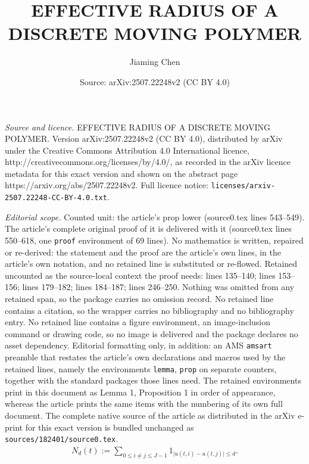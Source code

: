 \documentclass[10pt,a4paper]{amsart}
\title{EFFECTIVE RADIUS OF A DISCRETE MOVING POLYMER}
\author{Jiaming Chen}
\date{Source: arXiv:2507.22248v2 (CC BY 4.0)}
\begin{document}
\maketitle

\noindent\emph{Source and licence.} EFFECTIVE RADIUS OF A DISCRETE MOVING POLYMER. Version arXiv:2507.22248v2 (CC BY 4.0), distributed by arXiv under the Creative Commons Attribution 4.0 International licence, http://creativecommons.org/licenses/by/4.0/, as recorded in the arXiv licence metadata for this exact version and shown on the abstract page https://arxiv.org/abs/2507.22248v2. Full licence notice: \texttt{licenses/arxiv-2507.22248-CC-BY-4.0.txt}.\par\smallskip

\noindent\textit{Editorial scope.} Counted unit: the article's prop lower (source0.tex lines 543--549). The article's complete original proof of it is delivered with it (source0.tex lines 550--618, one \texttt{proof} environment of 69 lines). No mathematics is written, repaired or re-derived: the statement and the proof are the article's own lines, in the article's own notation, and no retained line is substituted or re-flowed.  Retained uncounted as the source-local context the proof needs: lines 135--140; lines 153--156; lines 179--182; lines 184--187; lines 246--250.  Nothing was omitted from any retained span, so the package carries no omission record.  No retained line contains a citation, so the wrapper carries no bibliography and no bibliography entry.  No retained line contains a figure environment, an image-inclusion command or drawing code, so no image is delivered and the package declares no asset dependency.  Editorial formatting only, in addition: an AMS \texttt{amsart} preamble that restates the article's own declarations and macros used by the retained lines, namely the environments \texttt{lemma}, \texttt{prop} on separate counters, together with the standard packages those lines need.  The retained environments print in this document as Lemma 1, Proposition 1 in order of appearance, whereas the article prints the same items with the numbering of its own full document.  The complete native source of the article as distributed in the arXiv e-print for this exact version is bundled unchanged as \texttt{sources/182401/source0.tex}.
\begin{equation}
\label{localTime}
\begin{split}
    N_d(t):=\sum_{0\leq i\neq j\leq J-1}1_{\vert u(t,i)-u(t,j)\vert\leq d}.
    \end{split}
\end{equation}
\end{document}
